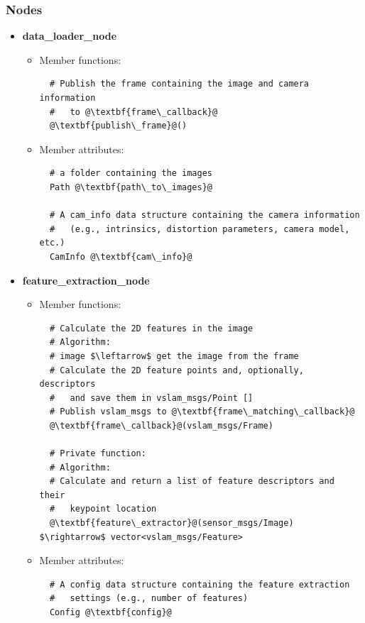 \subsubsection{Nodes}

\begin{itemize}
  \item \textbf{data\_loader\_node}
  \begin{itemize}
    \item Member functions:
\begin{lstlisting}
  # Publish the frame containing the image and camera information
  #   to @\textbf{frame\_callback}@
  @\textbf{publish\_frame}@()
\end{lstlisting}

    \item Member attributes:
\begin{lstlisting}
  # a folder containing the images
  Path @\textbf{path\_to\_images}@ 
    
  # A cam_info data structure containing the camera information 
  #   (e.g., intrinsics, distortion parameters, camera model, etc.)
  CamInfo @\textbf{cam\_info}@
\end{lstlisting}
  \end{itemize}  
  
  \item \textbf{feature\_extraction\_node}
  \begin{itemize}
    \item Member functions:
\begin{lstlisting}
  # Calculate the 2D features in the image
  # Algorithm:
  # image $\leftarrow$ get the image from the frame
  # Calculate the 2D feature points and, optionally, descriptors
  #   and save them in vslam_msgs/Point []
  # Publish vslam_msgs to @\textbf{frame\_matching\_callback}@
  @\textbf{frame\_callback}@(vslam_msgs/Frame) 

  # Private function:
  # Algorithm: 
  # Calculate and return a list of feature descriptors and their 
  #   keypoint location
  @\textbf{feature\_extractor}@(sensor_msgs/Image) $\rightarrow$ vector<vslam_msgs/Feature>
\end{lstlisting}

    \item Member attributes:
\begin{lstlisting}
  # A config data structure containing the feature extraction 
  #   settings (e.g., number of features)
  Config @\textbf{config}@
\end{lstlisting}
  \end{itemize}  



\end{itemize}

